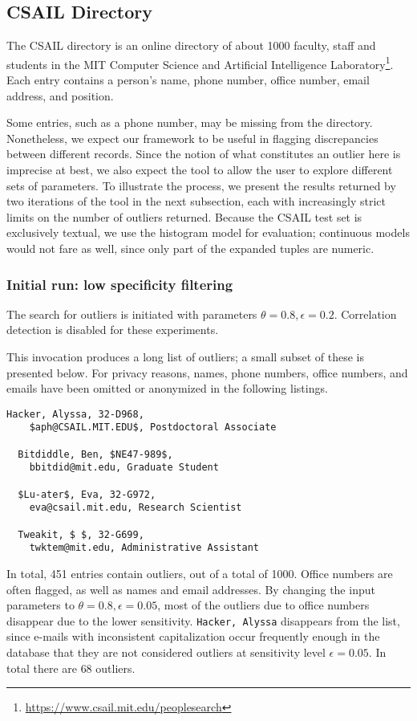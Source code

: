 \subsection{CSAIL Directory}
\label{sec:csail-directory-evaluation}

The CSAIL directory is an online directory of about 1000 faculty, staff and students in the MIT Computer Science and Artificial Intelligence Laboratory\footnote{\url{https://www.csail.mit.edu/peoplesearch}}. Each entry contains a person's name, phone number, office number, email address, and position.

Some entries, such as a phone number, may be missing from the directory. Nonetheless, we expect our framework to be useful in flagging discrepancies between different records. Since the notion of what constitutes an outlier here is imprecise at best, we also expect the tool to allow the user to explore different sets of parameters. To illustrate the process, we present the results returned by two iterations of the tool in the next subsection, each with increasingly strict limits on the number of outliers returned. Because the CSAIL test set is exclusively textual, we use the histogram model for evaluation; continuous models would not fare as well, since only part of the expanded tuples are numeric.

\subsubsection{Initial run: low specificity filtering}
The search for outliers is initiated with parameters $\theta = 0.8, \epsilon = 0.2$. Correlation detection is disabled for these experiments.

This invocation produces a long list of outliers; a small subset of these is presented below. For privacy reasons, names,  phone numbers, office numbers, and emails have been omitted or anonymized in the following listings.

\begin{lstlisting}[gobble=2]
  Hacker, Alyssa, 32-D968,
    $aph@CSAIL.MIT.EDU$, Postdoctoral Associate

  Bitdiddle, Ben, $NE47-989$,
    bbitdid@mit.edu, Graduate Student

  $Lu-ater$, Eva, 32-G972,
    eva@csail.mit.edu, Research Scientist

  Tweakit, $ $, 32-G699,
    twktem@mit.edu, Administrative Assistant
\end{lstlisting}

In total, 451 entries contain outliers, out of a total of 1000. Office numbers are often flagged, as well as names and email addresses. By changing the input parameters to $\theta = 0.8, \epsilon = 0.05$, most of the outliers due to office numbers disappear due to the lower sensitivity. \lstinline{Hacker, Alyssa} disappears from the list, since e-mails with inconsistent capitalization occur frequently enough in the database that they are not considered outliers at sensitivity level $\epsilon = 0.05$. In total there are $68$ outliers.

